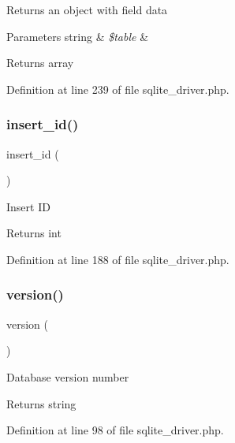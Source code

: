 Returns an object with field data


\begin{DoxyParams}[1]{Parameters}
string & {\em \$table} & \\
\hline
\end{DoxyParams}
\begin{DoxyReturn}{Returns}
array 
\end{DoxyReturn}


Definition at line 239 of file sqlite\+\_\+driver.\+php.

\mbox{\label{class_c_i___d_b__sqlite__driver_a933f2cde8dc7f87875e257d0a4902e99}} 
\subsubsection{\texorpdfstring{insert\_id()}{insert\_id()}}
{\footnotesize\ttfamily insert\+\_\+id (\begin{DoxyParamCaption}{ }\end{DoxyParamCaption})}

Insert ID

\begin{DoxyReturn}{Returns}
int 
\end{DoxyReturn}


Definition at line 188 of file sqlite\+\_\+driver.\+php.

\mbox{\label{class_c_i___d_b__sqlite__driver_a6080dae0886626b9a4cedb29240708b1}} 
\subsubsection{\texorpdfstring{version()}{version()}}
{\footnotesize\ttfamily version (\begin{DoxyParamCaption}{ }\end{DoxyParamCaption})}

Database version number

\begin{DoxyReturn}{Returns}
string 
\end{DoxyReturn}


Definition at line 98 of file sqlite\+\_\+driver.\+php.



